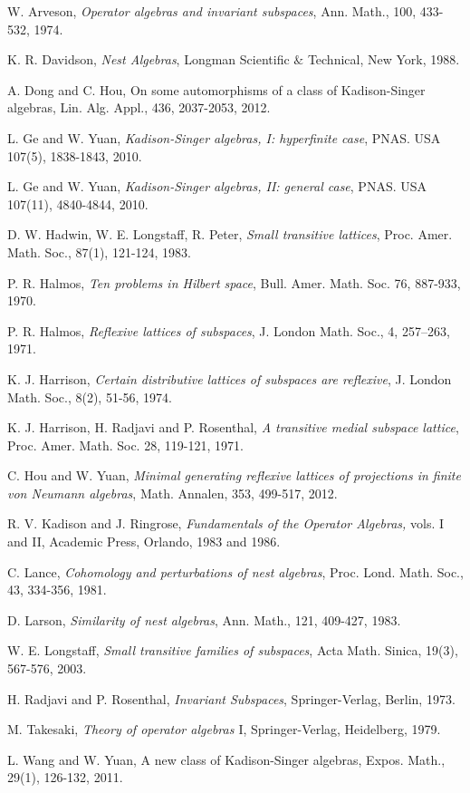 \documentclass{jaums}
\theoremstyle{thmit} %
\theoremstyle{thmrm} %
\begin{document}



\begin{thebibliography}{21}

\bibitem{[Ar]} W. Arveson, {\it{Operator algebras and invariant subspaces}},
Ann. Math., 100, 433-532, 1974.

\bibitem{[Da]} K. R. Davidson, {\it{Nest Algebras}}, Longman Scientific $\&$
Technical, New York, 1988.

\bibitem{[DH]} A. Dong and C. Hou, On some automorphisms of a class of
Kadison-Singer algebras, Lin. Alg. Appl., 436, 2037-2053, 2012.

\bibitem{[GY]} L. Ge and W. Yuan, {\it{Kadison-Singer algebras, I: hyperfinite
case}}, PNAS. USA 107(5), 1838-1843, 2010.

\bibitem{[GY2]} L. Ge and W. Yuan, {\it{Kadison-Singer algebras, II: general
case}}, PNAS. USA 107(11), 4840-4844, 2010.


\bibitem{[HLP]} D. W. Hadwin, W. E. Longstaff, R. Peter, {\it{Small transitive
lattices}}, Proc. Amer. Math. Soc., 87(1),
121-124, 1983.

\bibitem{[Hal]} P. R. Halmos, {\it{Ten problems in Hilbert space}}, Bull. Amer.
Math. Soc. 76, 887-933, 1970.

\bibitem{[Ha2]} P. R. Halmos, {\it{Reflexive lattices of subspaces}}, J. London
Math. Soc., 4, 257--263, 1971.


\bibitem{[Har]} K. J. Harrison, {\it{Certain distributive lattices of subspaces
are reflexive}}, J. London Math. Soc., 8(2), 51-56, 1974.

\bibitem{[HRR]} K. J. Harrison, H. Radjavi and P. Rosenthal, {\it{A transitive
medial subspace lattice}}, Proc. Amer.
Math. Soc. 28, 119-121, 1971.

\bibitem{[HY]} C.  Hou and W. Yuan, {\it{Minimal generating reflexive lattices
of projections
in finite von Neumann algebras}}, Math. Annalen, 353, 499-517, 2012.



\bibitem{[KR]} R. V. Kadison and J. Ringrose, {\it Fundamentals of the
Operator Algebras,} vols. I and II, Academic Press, Orlando, 1983
and 1986.


\bibitem{[Lan]} C. Lance, {\it{Cohomology and perturbations of nest algebras}},
Proc. Lond. Math. Soc., 43, 334-356, 1981.

\bibitem{[La]} D. Larson, {\it{Similarity of nest algebras}}, Ann. Math., 121,
409-427, 1983.

\bibitem{[Lo]} W. E. Longstaff, {\it{Small transitive families of subspaces}},
Acta Math. Sinica, 19(3), 567-576, 2003.

\bibitem{[RR]} H. Radjavi and P. Rosenthal, {\it{Invariant Subspaces}},
Springer-Verlag, Berlin, 1973.

\bibitem{[Ta]} M. Takesaki, {\it{Theory of operator algebras $\mathrm{I}$}},
Springer-Verlag, Heidelberg, 1979.

\bibitem{[WY]} L. Wang and W. Yuan, A new class of Kadison-Singer algebras,
Expos. Math., 29(1), 126-132, 2011.

\end{thebibliography}
\end{document}

